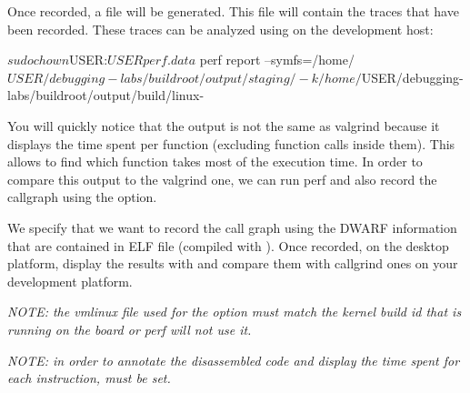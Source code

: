 Once recorded, a  file will be generated. This file will
contain the traces that have been recorded. These traces can be analyzed using
 on the development host:

\begin{bashinput}
$ sudo chown $USER:$USER perf.data $ perf report
	--symfs=/home/$USER/debugging-labs/buildroot/output/staging/ -k
	/home/$USER/debugging-labs/buildroot/output/build/linux-%
\end{bashinput}

You will quickly notice that the output is not the same as valgrind because it
displays the time spent per function (excluding function calls inside them).
This allows to find which function takes most of the execution time. In order to
compare this output to the valgrind one, we can run perf and also record the
callgraph using the  option.


We specify that we want to record the call graph using the DWARF information
that are contained in ELF file (compiled with ). Once recorded, on the
desktop platform, display the results with  and compare them
with callgrind ones on your development platform.

{\em NOTE: the vmlinux file used for the  option must match the kernel
build id that is running on the board or perf will not use it.}

{\em NOTE: in order to annotate the disassembled code and display the time spent
for each instruction,  must be set.}
